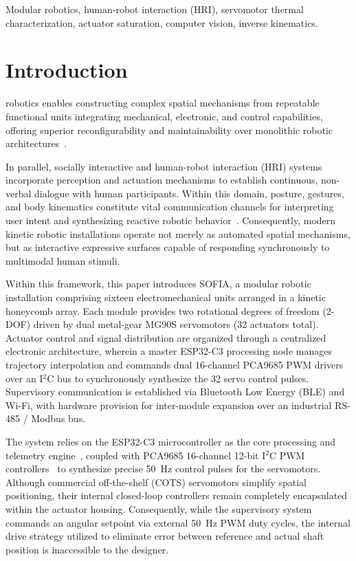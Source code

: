\documentclass[lettersize,journal]{IEEEtran}
\begin{document}
	\begin{IEEEkeywords}
		Modular robotics, human-robot interaction (HRI), servomotor thermal characterization, actuator saturation, computer vision, inverse kinematics.
	\end{IEEEkeywords}
	\fontsize{9.5pt}{10.0pt}\selectfont
	
	\section{Introduction}
	\label{sec:introduction}
	
	 robotics enables constructing complex spatial mechanisms from repeatable functional units integrating mechanical, electronic, and control capabilities, offering superior reconfigurability and maintainability over monolithic robotic architectures~\cite{seo2019modular}.
	
	In parallel, socially interactive and human-robot interaction (HRI) systems incorporate perception and actuation mechanisms to establish continuous, non-verbal dialogue with human participants. Within this domain, posture, gestures, and body kinematics constitute vital communication channels for interpreting user intent and synthesizing reactive robotic behavior~\cite{fong2003social}. Consequently, modern kinetic robotic installations operate not merely as automated spatial mechanisms, but as interactive expressive surfaces capable of responding synchronously to multimodal human stimuli.
	
	Within this framework, this paper introduces SOFIA, a modular robotic installation comprising sixteen electromechanical units arranged in a kinetic honeycomb array. Each module provides two rotational degrees of freedom (2-DOF) driven by dual metal-gear MG90S servomotors (32 actuators total). Actuator control and signal distribution are organized through a centralized electronic architecture, wherein a master ESP32-C3 processing node manages trajectory interpolation and commands dual 16-channel PCA9685 PWM drivers over an I$^2$C bus to synchronously synthesize the 32 servo control pulses. Supervisory communication is established via Bluetooth Low Energy (BLE) and Wi-Fi, with hardware provision for inter-module expansion over an industrial RS-485 / Modbus bus.
	
	The system relies on the ESP32-C3 microcontroller as the core processing and telemetry engine~\cite{espressif2024esp32c3}, coupled with PCA9685 16-channel 12-bit I$^2$C PWM controllers~\cite{nxp2015pca9685} to synthesize precise 50~Hz control pulses for the servomotors. Although commercial off-the-shelf (COTS) servomotors simplify spatial positioning, their internal closed-loop controllers remain completely encapsulated within the actuator housing. Consequently, while the supervisory system commands an angular setpoint via external 50~Hz PWM duty cycles, the internal drive strategy utilized to eliminate error between reference and actual shaft position is inaccessible to the designer.
	
\end{document}

